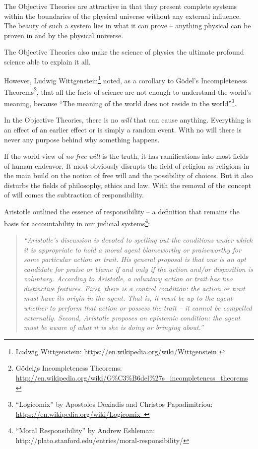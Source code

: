 \documentclass[11pt]{article}
\begin{document}
The Objective Theories are attractive in that they present complete systems
within the boundaries of the physical universe without any external influence.
The beauty of such a system lies in what it can prove -- anything physical can
be proven in and by the physical universe.

The Objective Theories also make the science of physics the ultimate profound
science able to explain it all.

However, Ludwig Wittgenstein\footnote{ Ludwig Wittgenstein: 
\url{https://en.wikipedia.org/wiki/Wittgenstein }}
noted, as a corollary to G\"{o}del's Incompleteness Theorems\footnote{ G\"{o}del¿s Incompleteness Theorems:
\url{http://en.wikipedia.org/wiki/G\%C3\%B6del\%27s\_incompleteness\_theorems
}}, that all the facts of science are not enough to understand the world's
meaning, because ``The meaning of the world does not reside in the
world''\footnote{ ``Logicomix'' by Apostolos Doxiadis and Christos Papadimitriou:
\url{https://en.wikipedia.org/wiki/Logicomix }}.

In the Objective Theories, there is no {\em will} that can cause anything.
Everything is an effect of an earlier effect or is simply a random event. With
no will there is never any purpose behind why something happens.

If the world view of {\em no free will} is the truth, it has ramifications into most
fields of human endeavor. It most obviously disrupts the field of religion as
religions in the main build on the notion of free will and the possibility of
choices. But it also disturbs the fields of philosophy, ethics and law. With
the removal of the concept of will comes the subtraction of responsibility.

\newpage

Aristotle outlined the essence of responsibility -- a definition that remains
the basis for accountability in our judicial systems\footnote{ ``Moral
Responsibility'' by Andrew Eshleman:
http://plato.stanford.edu/entries/moral-responsibility/}:

\begin{quotation}
   \em ``Aristotle's discussion is devoted to spelling out the conditions under
   which it is appropriate to hold a moral agent blameworthy or praiseworthy for
   some particular action or trait. His general proposal is that one is an apt
   candidate for praise or blame if and only if the action and/or disposition is
   voluntary. According to Aristotle, a voluntary action or trait has two
   distinctive features. First, there is a control condition: the action or
   trait must have its origin in the agent. That is, it must be up to the agent
   whether to perform that action or possess the trait -- it cannot be compelled
   externally. Second, Aristotle proposes an epistemic condition: the agent must
   be aware of what it is she is doing or bringing about.''
\end{quotation}
\end{document}
